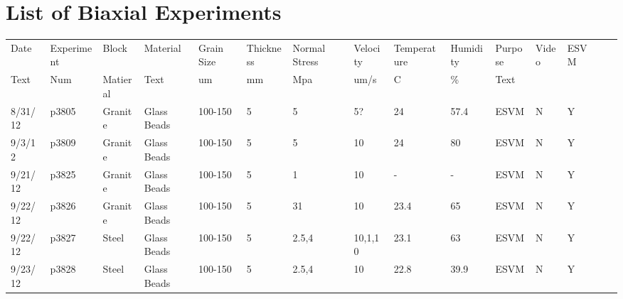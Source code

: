\chapter{List of Biaxial Experiments}

\begin{landscape}
\begin{longtable}{lllllllllllllll}
Date     & Experiment & Block            & Material     & Grain Size   & Thickness & Normal Stress & Velocity                     & Temperature & Humidity & Purpose                                         & Video & ESVM &  &  \\
Text     & Num        & Matieral         & Text         & um           & mm        & Mpa           & um/s                         & C           & \%       & Text                                            &       &      &  &  \\
\hline
\hline
8/31/12  & p3805      & Granite          & Glass Beads  & 100-150      & 5         & 5             & 5?                           & 24          & 57.4     & ESVM                                            & N     & Y    &  &  \\
9/3/12   & p3809      & Granite          & Glass Beads  & 100-150      & 5         & 5             & 10                           & 24          & 80       & ESVM                                            & N     & Y    &  &  \\
9/21/12  & p3825      & Granite          & Glass Beads  & 100-150      & 5         & 1             & 10                           & -           & -        & ESVM                                            & N     & Y    &  &  \\
9/22/12  & p3826      & Granite          & Glass Beads  & 100-150      & 5         & 31            & 10                           & 23.4        & 65       & ESVM                                            & N     & Y    &  &  \\
9/22/12  & p3827      & Steel            & Glass Beads  & 100-150      & 5         & 2.5,4         & 10,1,10                      & 23.1        & 63       & ESVM                                            & N     & Y    &  &  \\
9/23/12  & p3828      & Steel            & Glass Beads  & 100-150      & 5         & 2.5,4         & 10                           & 22.8        & 39.9     & ESVM                                            & N     & Y    &  &  \\

\end{longtable}
\end{landscape}
